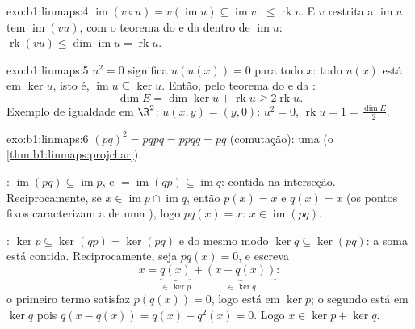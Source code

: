 \begin{solution}{exo:b1:linmaps:4}
$\operatorname{im}(v \circ u) = v(\operatorname{im} u) \subseteq
\operatorname{im} v$:  $\leq \operatorname{rk} v$. E $v$ restrita a $\operatorname{im} u$ tem  $\operatorname{im}(vu)$, com o
teorema do  e da  dentro de $\operatorname{im} u$: $\operatorname{rk}(vu) \leq
\dim\operatorname{im} u = \operatorname{rk} u$.
\end{solution}

\begin{solution}{exo:b1:linmaps:5}
$u^2 = 0$ significa $u(u(x)) = 0$ para todo $x$: todo $u(x)$ está em
$\ker u$, isto é, $\operatorname{im} u \subseteq \ker u$. Então, pelo teorema do  e da :
\[
\dim E = \dim\ker u + \operatorname{rk} u \geq 2\operatorname{rk} u .
\]
Exemplo de igualdade em $\R^2$: $u(x, y) = (y, 0)$: $u^2 = 0$, $\operatorname{rk} u = 1 = \frac{\dim E}{2}$.
\end{solution}

\begin{solution}{exo:b1:linmaps:6}
$(pq)^2 = pqpq = ppqq = pq$ (comutação): uma  (o \cref{thm:b1:linmaps:projchar}).

: $\operatorname{im}(pq) \subseteq \operatorname{im} p$, e $= \operatorname{im}(qp) \subseteq \operatorname{im} q$: contida na interseção. Reciprocamente, se
$x \in \operatorname{im} p \cap
\operatorname{im} q$, então $p(x) = x$ e $q(x) = x$ (os pontos fixos caracterizam a  de
uma ), logo $pq(x) = x$: $x \in
\operatorname{im}(pq)$.

: $\ker p \subseteq \ker(qp) = \ker(pq)$ e do mesmo modo $\ker q
\subseteq \ker(pq)$: a soma está contida.
Reciprocamente, seja $pq(x) =
0$, e escreva
\[
x = \underbrace{q(x)}_{\in\, \ker p} +
\underbrace{(x - q(x))}_{\in\, \ker q} :
\]
o primeiro termo satisfaz $p(q(x)) = 0$, logo está em $\ker p$; o segundo
está em $\ker q$ pois $q(x - q(x)) = q(x) - q^2(x) = 0$. Logo $x \in \ker p + \ker q$.
\end{solution}

